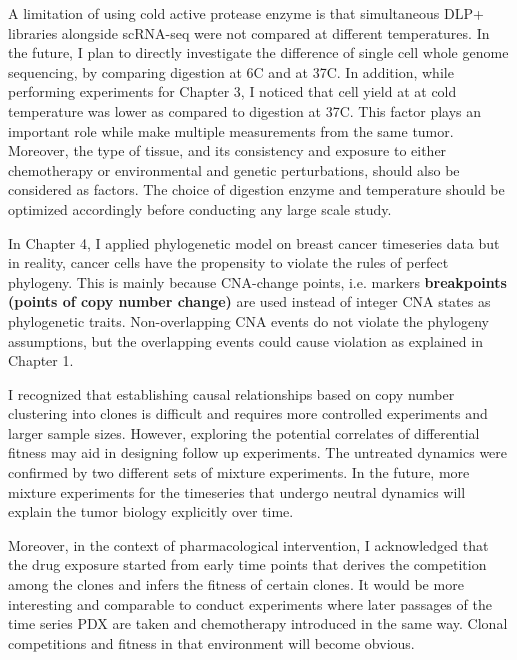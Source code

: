 A limitation of using cold active protease enzyme is that  simultaneous \ac{DLP+} libraries alongside scRNA-seq were not compared at different temperatures. In the future, I plan to directly investigate the difference of single cell whole genome sequencing, by comparing digestion at 6\textdegree C and at 37\textdegree C. In addition, while performing  experiments for Chapter 3, I noticed that cell yield at at cold temperature was lower as compared to digestion at 37\textdegree C. This factor plays an important role while make multiple measurements from the same tumor. Moreover, the type of tissue, and its consistency and exposure to either chemotherapy or environmental and genetic perturbations, should also be considered as factors. The choice of digestion enzyme and temperature should be optimized accordingly before conducting any large scale study.

In Chapter 4, I applied phylogenetic model on breast cancer timeseries data but in reality, cancer cells have the propensity to violate the rules of perfect phylogeny. This is mainly because CNA-change points, i.e. markers \textbf{breakpoints (points of copy number change)} are used instead of integer CNA states as phylogenetic traits. Non-overlapping CNA events do not violate the phylogeny assumptions, but the overlapping events could cause violation as explained in Chapter 1. 


I recognized that establishing causal relationships based on copy number clustering into clones is difficult and requires more controlled experiments and larger sample sizes. However, exploring the potential correlates of differential fitness may aid in designing follow up experiments. The untreated dynamics were confirmed by two different sets of mixture experiments. In the future, more mixture experiments for the timeseries that undergo neutral dynamics will explain the tumor biology explicitly over time. 

Moreover, in the context of pharmacological intervention, I acknowledged that the drug exposure started from early time points that derives the competition among the clones and infers the fitness of certain clones. It would be more interesting and comparable to conduct experiments where later passages of the time series PDX are taken and chemotherapy introduced in the same way. Clonal competitions and fitness in that environment will become obvious.

